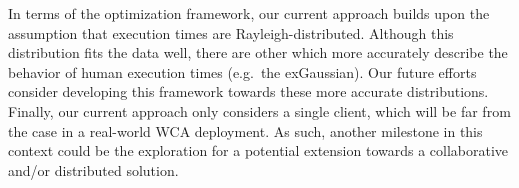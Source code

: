 In terms of the optimization framework, our current approach builds upon the assumption that execution times are Rayleigh-distributed.
Although this distribution fits the data well, there are other which more accurately describe the behavior of human execution times (e.g.\ the \acl{exGaussian}).
Our future efforts consider developing this framework towards these more accurate distributions.
Finally, our current approach only considers a single client, which will be far from the case in a real-world \ac{WCA} deployment.
As such, another milestone in this context could be the exploration for a potential extension towards a collaborative and/or distributed solution.